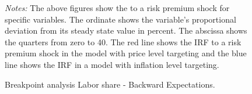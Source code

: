 \documentclass[11pt, a4paper, leqno]{article}
\begin{document}
\begin{figure}[ht!]
	\caption{Breakpoint analysis Labor share - Backward Expectations.}
	\label{fig:irf}
	\centering
    	\bigskip
	\begin{minipage}{\textwidth}%
		\footnotesize\setlength{\baselineskip}{11pt}%
		\bigskip \textit{Notes:} The above figures show the  to a risk premium shock for specific variables. The ordinate shows the variable's proportional deviation from its steady state value in percent. The abscissa shows the quarters from zero to 40. The red line shows the IRF to a risk premium shock in the model with price level targeting and the blue line shows the IRF in a model with inflation level targeting.
	\end{minipage}
\end{figure}
\end{document}
